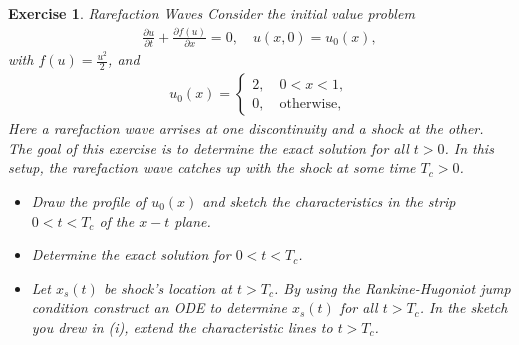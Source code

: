 \documentclass[10pt,letterpaper]{article}
\theoremstyle{break}
\newtheorem{exercise}{Exercise}
\begin{document}
\begin{exercise}{Rarefaction Waves}
	Consider the initial value problem 
	\begin{align}
		\frac{\partial u}{\partial t}
		+
		\frac{\partial f(u)}{\partial x}
		=0,
		\quad
		u(x,0) = u_0(x),
	\end{align}
	with $f(u) =\frac{u^2}{2}$, and
	\begin{align}
		u_0(x)
		=
		\left \{
		\begin{array}{ll}
		2, \quad0<x<1, \\
		0, \quad\text{otherwise},
		\end{array}
		\right.
	\end{align}
	Here a rarefaction wave arrises at one discontinuity and a shock at the other. 
	The goal of this exercise is to determine the exact solution for all $t>0$. 
	In this setup, the rarefaction wave catches up with the shock at some time $T_c>0$.
	\begin{itemize}
		\item[(i)]
		Draw the profile of $u_0(x)$
		and sketch the characteristics in the strip 
		$0 < t < T_c$ of the $x-t$ plane.
		\item[(ii)]
		Determine the exact solution for $0 < t < T_c$.
		\item[(iii)]
		Let $x_s(t)$ be shock's location at $t > T_c$. 
		By using the Rankine-Hugoniot jump condition construct an ODE to determine 
		$x_s(t)$ for all $t > T_c$. 
		In the sketch you drew in (i), extend the characteristic lines to $t > T_c$.
	\end{itemize}

\end{exercise}
\end{document}
